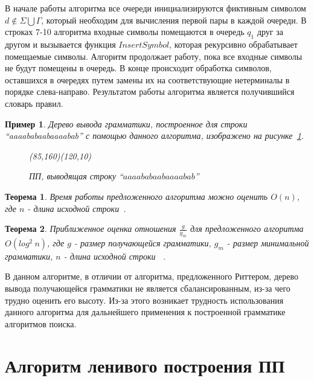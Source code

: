 \documentclass[12pt,a4paper]{extarticle}
\theoremstyle{break}
\newtheorem{theorem}{Теорема}
\newtheorem{example}{Пример}
\begin{document}
В начале работы алгоритма все очереди инициализируются фиктивным символом $d
\notin \Sigma \bigcup \Gamma$, который необходим для вычисления первой пары в
каждой очереди. В строках 7-10 алгоритма входные символы помещаются в очередь
$q_1$ друг за другом и вызывается функция $InsertSymbol$, которая рекурсивно
обрабатывает помещаемые символы. Алгоритм продолжает работу, пока все входные
символы не будут помещены в очередь. В конце происходит обработка символов,
оставшихся в очередях путем замены их на соответствующие нетерминалы в порядке
слева-направо. Результатом работы алгоритма является получившийся словарь
правил.

\begin{example}
Дерево вывода грамматики, построенное для строки ``aaaababaabaaaabab''  с
помощью данного алгоритма, изображено на рисунке~\ref{lca}. 
	\begin{figure}[!h]
	    \begin{center}
	        \begin{picture}(85,160)(120,10)
				\picLCA
			\end{picture}
	    \end{center}
	    \caption{ПП, выводящая строку ``$aaaababaabaaaabab$''}
	    \label{lca}
	\end{figure}
\end{example}

\begin{theorem} 
Время работы предложенного алгоритма можно оценить
$O(n)$, где $n$ - длина исходной строки~\cite{lca}.
\end{theorem}

\begin{theorem}
Приближенное оценка отношения $\frac{g}{g_m}$ для 
предложенного алгоритма $O(log^2\ n)$, где $g$ - размер получающейся
грамматики, $g_m$ - размер минимальной грамматики, $n$ - длина исходной строки
~\cite{lca}.
\end{theorem}

В данном алгоритме, в отличии от алгоритма, предложенного Риттером, дерево вывода
получающейся грамматики не является сбалансированным, из-за чего трудно
оценить его высоту. Из-за этого возникает трудность использования данного
алгоритма для дальнейшего применения к построенной грамматике алгоритмов поиска.

\newpage
\section{Алгоритм ленивого построения ПП}
\end{document}
